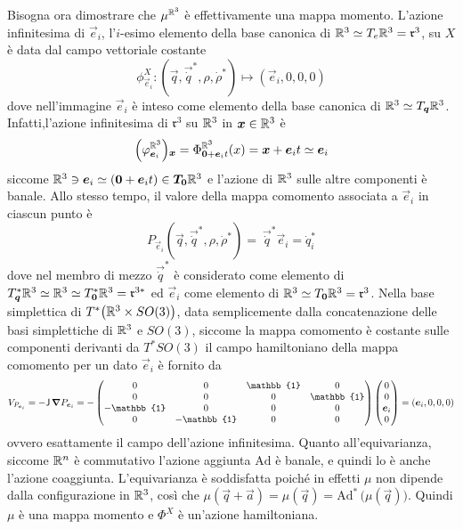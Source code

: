 Bisogna ora dimostrare che $\mu^{\mathbb{R}^3}$ è effettivamente una mappa momento. L'azione infinitesima di $\vec{e}_i$, l'$i$-esimo elemento della base canonica di $\mathbb{R}^3 \simeq T_e \mathbb{R}^3 = \mathfrak{r}^3$, su $X$ è data dal campo vettoriale costante
\begin{equation}
\phi_{\vec{e}_i}^X: (\vec{q},\vec{\dot{q}}^*, \rho, \dot{\rho}^*)\longmapsto (\vec{e}_i, 0, 0, 0)
\end{equation}
dove nell'immagine $\vec{e}_i$ è inteso come elemento della base canonica di $\mathbb{R}^3 \simeq T_{\boldsymbol{q}}\mathbb{R}^3$. Infatti,l'azione infinitesima di $\mathfrak{r}^3$ su $\mathbb{R}^3$ in $\boldsymbol{x} \in \mathbb{R}^3$ è \begin{equation}
  \Big(\varphi^{\mathbb{R}^3}_{\boldsymbol{e}_i}\Big)\boldsymbol{_x} = \Phi^{\mathbb{R}^3}_{\boldsymbol{0} + \boldsymbol{e}_i t}(x) = \boldsymbol{x} + \boldsymbol{e}_i t \simeq \boldsymbol{e}_i
\end{equation}
siccome $\mathbb{R}^3 \ni \boldsymbol{e}_i \simeq (\boldsymbol{0}+\boldsymbol{e}_i t) \in \boldsymbol{T_0} \mathbb{R}^3 $ e l'azione di $\mathbb{R}^3$ sulle altre componenti è banale. Allo stesso tempo, il valore della mappa comomento associata a $\vec{e}_i$ in ciascun punto è 
\begin{equation}
  P_{\vec{e}_i}(\vec{q},\vec{\dot{q}}^*, \rho, \dot{\rho}^*) =\ \vec{\dot{q}}^*\! \vec{e}_i = \dot{q}^*_i
\end{equation} 
dove nel membro di mezzo $\vec{\dot{q}}^*$ è considerato come elemento di $T^*_{\boldsymbol{q}}\mathbb{R}^3 \simeq \mathbb{R}^3 \simeq T^*_{\boldsymbol{0}}\mathbb{R}^3 = \mathfrak{r}^{3*}$ ed $\vec{e}_i$ come elemento di $\mathbb{R}^3 \simeq T_{\boldsymbol{0}}\mathbb{R}^3 = \mathfrak{r}^3$. Nella base simplettica di $T^*\big(\mathbb{R}^3 \times  SO(3)\big)$, data semplicemente dalla concatenazione delle basi simplettiche di $\mathbb{R}^3$ e $SO(3)$, siccome la mappa comomento è costante sulle componenti derivanti da $T^*SO(3)$ il campo hamiltoniano della mappa comomento per un dato $\vec{e}_i$ è fornito da \begin{equation}
V_{P_{\vec{e}_i}} = - \mathsf{J}\, \grad{P_{\vec{e}_i}} = - \begin{pmatrix}
  0 & 0 & \mathbb{1} & 0 \\
  0 & 0 & 0 & \mathbb{1} \\
  -\mathbb{1} & 0 & 0 & 0 \\ 
  0 & -\mathbb{1} & 0 & 0 
\end{pmatrix} \begin{pmatrix}
0 \\ 0 \\ \vec{e}_i \\ 0
\end{pmatrix} = (\vec{e}_i, 0, 0, 0)
\end{equation} 
ovvero esattamente il campo dell'azione infinitesima. Quanto all'equivarianza, siccome $\mathbb{R}^{n}$ è commutativo l'azione aggiunta $\mathrm{Ad}$ è banale, e quindi lo è anche l'azione coaggiunta. L'equivarianza è soddisfatta poiché in effetti $\mu$ non dipende dalla configurazione in $\mathbb{R}^3$, così che $\mu(\vec{q}+\vec{a}) = \mu(\vec{q}) = \mathrm{Ad}^*\,\big(\mu(\vec{q})\big)$. Quindi $\mu$ è una mappa momento e $\Phi^X$ è un'azione hamiltoniana.

